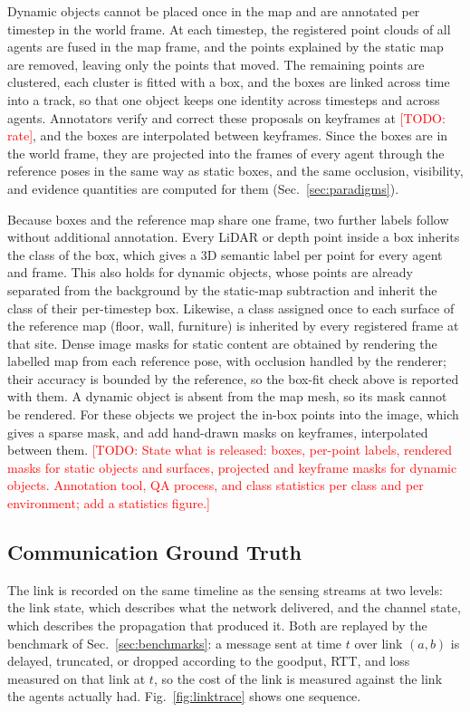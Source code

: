 \documentclass[conference]{IEEEtran}
\newcommand{\todo}[1]{\textcolor{red}{[TODO: #1]}}
\begin{document}
Dynamic objects cannot be placed once in the map and are annotated
per timestep in the world frame. At each timestep, the registered
point clouds of all agents are fused in the map frame, and the
points explained by the static map are removed, leaving only the
points that moved. The remaining points are clustered, each cluster
is fitted with a box, and the boxes are linked across time into a
track, so that one object keeps one identity across timesteps and
across agents. Annotators verify and correct these proposals on
keyframes at \todo{rate}, and the boxes are interpolated between
keyframes. Since the boxes are in the world frame, they are projected
into the frames of every agent through the reference poses in the
same way as static boxes, and the same occlusion, visibility, and
evidence quantities are computed for them (Sec.~\ref{sec:paradigms}).

Because boxes and the reference map share one frame, two further
labels follow without additional annotation. Every LiDAR or depth
point inside a box inherits the class of the box, which gives a 3D
semantic label per point for every agent and frame. This also holds
for dynamic objects, whose points are already separated from the
background by the static-map subtraction and inherit the class of
their per-timestep box. Likewise, a class assigned once to each
surface of the reference map (floor, wall, furniture) is inherited by
every registered frame at that site. Dense image masks for static
content are obtained by rendering the labelled map from each
reference pose, with occlusion handled by the renderer; their
accuracy is bounded by the reference, so the box-fit check above is
reported with them. A dynamic object is absent from the map mesh, so
its mask cannot be rendered. For these objects we project the in-box
points into the image, which gives a sparse mask, and add hand-drawn
masks on keyframes, interpolated between them. \todo{State what is
released: boxes, per-point labels, rendered masks for static objects
and surfaces, projected and keyframe masks for dynamic objects.
Annotation tool, QA process, and class statistics per class and per
environment; add a statistics figure.}



\subsection{Communication Ground Truth}
\label{sec:commgt}
The link is recorded on the same timeline as the sensing streams at
two levels: the link state, which describes what the network
delivered, and the channel state, which describes the propagation
that produced it. Both are replayed by the benchmark of
Sec.~\ref{sec:benchmarks}: a message sent at time $t$ over link
$(a,b)$ is delayed, truncated, or dropped according to the goodput,
RTT, and loss measured on that link at $t$, so the cost of the link
is measured against the link the agents actually had.
Fig.~\ref{fig:linktrace} shows one sequence.
\end{document}
